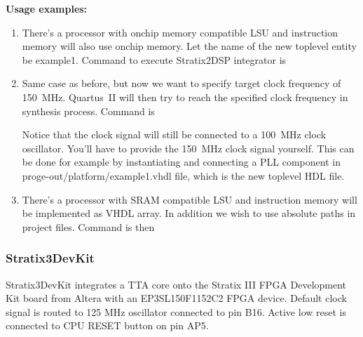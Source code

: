 \documentclass[a4paper,twoside]{tceusermanual}
\begin{document}
\textbf{Usage examples:} 
\begin{enumerate}

 \item There's a processor with onchip memory compatible LSU and instruction
memory will also use onchip memory. Let the name of the new toplevel entity
be example1. Command to execute Stratix2DSP integrator is \\

\item Same case as before, but now we want to specify target clock frequency
of 150~MHz. Quartus~II will then try to reach the specified clock frequency in
synthesis process. Command is \\

Notice that the clock signal will still be connected to a 100~MHz clock
oscillator. You'll have to provide the 150~MHz clock signal yourself. This can
be done for example by instantiating and connecting a PLL component in
proge-out/platform/example1.vhdl file, which is the new toplevel HDL file.

\item There's a processor with SRAM compatible LSU and instruction memory will
be implemented as VHDL array. In addition we wish to use absolute paths in
project files. Command is then \\

\end{enumerate}

\subsubsection{Stratix3DevKit}
\label{stratix3devkitIntegrator}

Stratix3DevKit integrates a TTA core onto the Stratix III FPGA
Development Kit board from Altera with an EP3SL150F1152C2 FPGA
device. Default clock signal is routed to 125 MHz oscillator connected
to pin B16. Active low reset is connected to CPU RESET button on pin
AP5.
\end{document}
